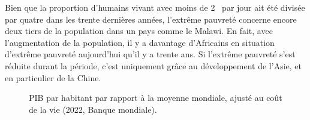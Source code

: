 \documentclass[a5paper,french,openany]{memoir}
\begin{document}
Bien que la proportion d'humains vivant avec moins de 2~\textit{\texteuro{}} par jour ait été divisée par quatre dans les trente dernières années, l'extrême pauvreté concerne encore deux tiers de la population dans un pays comme le Malawi. En fait, avec l'augmentation de la population, il y a davantage d'Africains en situation d'extrême pauvreté aujourd'hui qu'il y a trente ans. Si l'extrême pauvreté s'est réduite durant la période, c'est uniquement grâce au développement de l'Asie, et en particulier de la Chine. %

\begin{figure}[h!] 
  \caption[Inégalités de PIB par habitant]{PIB par habitant par rapport à la moyenne mondiale, ajusté au coût de la vie (2022, Banque mondiale). %
  }\label{fig:GDPpc}
\end{figure}
\end{document}
